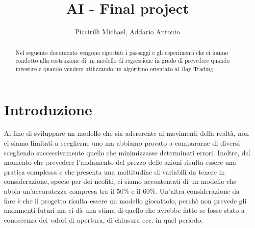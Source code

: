 \documentclass{article}
\title{AI - Final project}
\author{Piccirilli Michael, Addario Antonio}
\begin{document}
\maketitle

\begin{abstract}
Nel seguente documento vengono riportati i passaggi e gli esperimenti che ci hanno condotto alla costruzione di un modello di regressione in grado di prevedere quando investire e quando vendere utilizzando un algoritmo orientato al Day Trading.

\end{abstract}

\section{Introduzione}
Al fine di sviluppare un modello che sia adererente ai movimenti della realtà, non ci siamo limitati a sceglierne uno ma abbiamo provato a compararne di diversi scegliendo successivamente quello che minimizzasse determinati errori. Inoltre, dal momento che prevedere l'andamento del prezzo delle azioni risulta essere una pratica complessa e che presenta una moltitudine di variabili da tenere in considerazione, specie per dei neofiti, ci siamo accontentati di un modello che abbia un'accuratezza compresa tra il 50\% e il 60\%. Un'altra considerazione da fare è che il progetto risulta essere un modello giocattolo, perchè non prevede gli andamenti futuri ma ci dà una stima di quello che avrebbe fatto se fosse stato a conoscenza dei valori di apertura, di chiusura ecc. in quel periodo.
\end{document}
